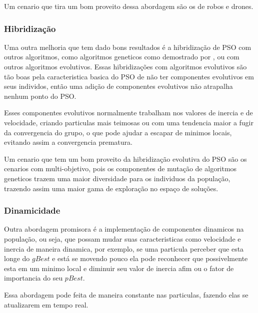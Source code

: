             Um cenario que tira um bom proveito dessa abordagem são os de robos e drones.            

        \subsubsection{Hibridização}
            Uma outra melhoria que tem dado bons resultados é a hibridização de PSO com outros algoritmos, como algoritmos geneticos como demostrado por \cite{carvalho2014}, ou com outros algoritmos evolutivos.\newline
            Essas hibridizações com algoritmos evolutivos são tão boas pela caracteristica basica do PSO de não ter componentes evolutivos em seus individos, então uma adição de componentes evolutivos não atrapalha nenhum ponto do PSO. \newline
            
            Esses componentes evolutivos normalmente trabalham nos valores de inercia e de velocidade, criando particulas mais teimosas ou com uma tendencia maior a fugir da convergencia do grupo, o que pode ajudar a escapar de minimos locais, evitando assim a convergencia prematura.\newline
            
            Um cenario que tem um bom proveito da hibridização evolutiva do PSO são os cenarios com multi-objetivo, pois os componentes de mutação de algoritmos geneticos trazem uma maior diversidade para os individuos da população, trazendo assim uma maior gama de exploração no espaço de soluções.

        \subsubsection{Dinamicidade}
            Outra abordagem promisora é a implementação de componentes dinamicos na população, ou seja, que possam mudar suas caracteristicas como velocidade e inercia de maneira dinamica, por exemplo, se uma particula perceber que esta longe do $gBest$ e está se movendo pouco ela pode reconhecer que possivelmente esta em um minimo local e diminuir seu valor de inercia afim ou o fator de importancia do seu $pBest$.\newline
            
            Essa abordagem pode feita de maneira constante nas particulas, fazendo elas se atualizarem em tempo real.


